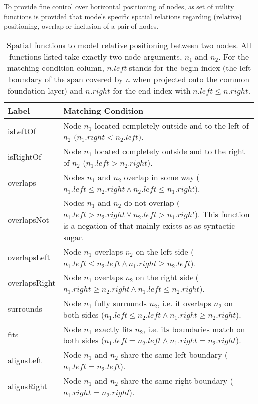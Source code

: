 \documentclass[11pt,a4paper]{report}
\begin{document}
To provide fine control over horizontal positioning of nodes, as set of utility functions is provided that models specific spatial relations regarding (relative) positioning, overlap or inclusion of a pair of nodes.

\begin{table}[!htb]\centering
\begin{tabular}{|p{}|p{}|}
	\hline 
	\textbf{Label} &  \textbf{Matching Condition} \\ 
	\hline 
	\hline  
	isLeftOf  & Node $n_1$ located completely outside and to the left of $n_2$ ($n_{1}.right < n_{2}.left$). \\  
	\hline  
	isRightOf  & Node $n_1$ located completely outside and to the right of $n_2$ ($n_{1}.left > n_{2}.right$). \\ 
	\hline  
	overlaps  & Nodes $n_1$ and $n_2$ overlap in some way ($n_{1}.left \le n_{2}.right \land n_{2}.left \le n_{1}.right$). \\ 
	\hline  
	overlapsNot  & Nodes $n_1$ and $n_2$ do not overlap ($n_{1}.left > n_{2}.right \lor n_{2}.left > n_{1}.right$). This function is a negation of \query{overlaps} that mainly exists as as syntactic sugar. \\  
	\hline 
	overlapsLeft  & Node $n_1$ overlaps $n_2$ on the left side ($n_{1}.left \le n_{2}.left \land n_{1}.right \ge n_{2}.left$). \\ 
	\hline 
	overlapsRight  & Node $n_1$ overlaps $n_2$ on the right side ($n_{1}.right \ge n_{2}.right \land n_{1}.left \le n_{2}.right$). \\ %
	\hline 
	surrounds  & Node $n_1$ fully surrounds $n_2$, i.e. it overlaps $n_2$ on both sides ($n_{1}.left \le n_{2}.left \land n_{1}.right \ge n_{2}.right$). \\ 
	\hline 
	fits  & Node $n_1$ exactly fits $n_2$, i.e. its boundaries match on both sides ($n_{1}.left = n_{2}.left \land n_{1}.right = n_{2}.right$). \\ 
	\hline 
	alignsLeft  & Node $n_1$ and $n_2$ share the same left boundary ($n_{1}.left = n_{2}.left$). \\ 
	\hline 
	alignsRight  & Node $n_1$ and $n_2$ share the same right boundary ($n_{1}.right = n_{2}.right$). \\ 
	\hline 
\end{tabular}
\caption[Spatial functions]{Spatial functions to model relative positioning between two nodes. All functions listed take exactly two node arguments, $n_1$ and $n_2$. For the matching condition column, $n.left$ stands for the begin index (the left boundary of the span covered by $n$ when projected onto the common foundation layer) and $n.right$ for the end index with $n.left \leq n.right$.}
\label{tab:spatial-functions}
\end{table}
\end{document}
